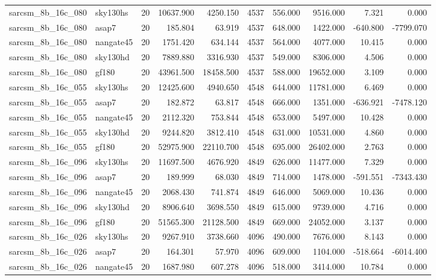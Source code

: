 \begin{longtable}{llrrrrrrrr}
sarcsm\_8b\_16c\_080 & sky130hs & 20 & 10637.900 & 4250.150 & 4537 & 556.000 & 9516.000 & 7.321 & 0.000 \\
sarcsm\_8b\_16c\_080 & asap7 & 20 & 185.804 & 63.919 & 4537 & 648.000 & 1422.000 & -640.800 & -7799.070 \\
sarcsm\_8b\_16c\_080 & nangate45 & 20 & 1751.420 & 634.144 & 4537 & 564.000 & 4077.000 & 10.415 & 0.000 \\
sarcsm\_8b\_16c\_080 & sky130hd & 20 & 7889.880 & 3316.930 & 4537 & 549.000 & 8306.000 & 4.506 & 0.000 \\
sarcsm\_8b\_16c\_080 & gf180 & 20 & 43961.500 & 18458.500 & 4537 & 588.000 & 19652.000 & 3.109 & 0.000 \\
sarcsm\_8b\_16c\_055 & sky130hs & 20 & 12425.600 & 4940.650 & 4548 & 644.000 & 11781.000 & 6.469 & 0.000 \\
sarcsm\_8b\_16c\_055 & asap7 & 20 & 182.872 & 63.817 & 4548 & 666.000 & 1351.000 & -636.921 & -7478.120 \\
sarcsm\_8b\_16c\_055 & nangate45 & 20 & 2112.320 & 753.844 & 4548 & 653.000 & 5497.000 & 10.428 & 0.000 \\
sarcsm\_8b\_16c\_055 & sky130hd & 20 & 9244.820 & 3812.410 & 4548 & 631.000 & 10531.000 & 4.860 & 0.000 \\
sarcsm\_8b\_16c\_055 & gf180 & 20 & 52975.900 & 22110.700 & 4548 & 695.000 & 26402.000 & 2.763 & 0.000 \\
sarcsm\_8b\_16c\_096 & sky130hs & 20 & 11697.500 & 4676.920 & 4849 & 626.000 & 11477.000 & 7.329 & 0.000 \\
sarcsm\_8b\_16c\_096 & asap7 & 20 & 189.999 & 68.030 & 4849 & 714.000 & 1478.000 & -591.551 & -7343.430 \\
sarcsm\_8b\_16c\_096 & nangate45 & 20 & 2068.430 & 741.874 & 4849 & 646.000 & 5069.000 & 10.436 & 0.000 \\
sarcsm\_8b\_16c\_096 & sky130hd & 20 & 8906.640 & 3698.550 & 4849 & 615.000 & 9739.000 & 4.716 & 0.000 \\
sarcsm\_8b\_16c\_096 & gf180 & 20 & 51565.300 & 21128.500 & 4849 & 669.000 & 24052.000 & 3.137 & 0.000 \\
sarcsm\_8b\_16c\_026 & sky130hs & 20 & 9267.910 & 3738.660 & 4096 & 490.000 & 7676.000 & 8.143 & 0.000 \\
sarcsm\_8b\_16c\_026 & asap7 & 20 & 164.301 & 57.970 & 4096 & 609.000 & 1104.000 & -518.664 & -6014.400 \\
sarcsm\_8b\_16c\_026 & nangate45 & 20 & 1687.980 & 607.278 & 4096 & 518.000 & 3414.000 & 10.784 & 0.000 \\

\end{longtable}
